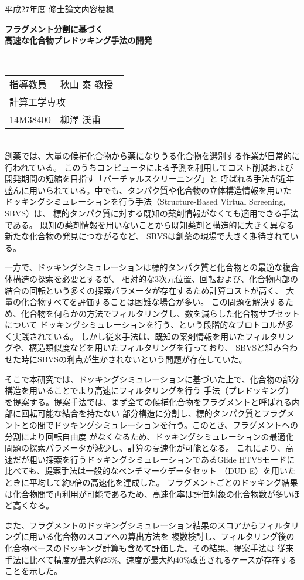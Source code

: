 {
 \thispagestyle{empty}
 \large
 \noindent
 平成27年度 修士論文内容梗概
　\\
 \begin{center}
  \textbf{\LARGE フラグメント分割に基づく\\高速な化合物プレドッキング手法の開発}
 \end{center}
　\\
 \hfill 
 \begin{tabular}{llll}
 指導教員& \multicolumn{3}{l}{秋山 泰 教授} \\
  \multicolumn{4}{l}{計算工学専攻} \\
 14M38400\hspace{.5cm} & {柳澤 渓甫}
 \end{tabular}

\mbox{}\\

創薬では、大量の候補化合物から薬になりうる化合物を選別する作業が日常的に行われている。
このうちコンピュータによる予測を利用してコスト削減および開発期間の短縮を目指す「バーチャルスクリーニング」と
呼ばれる手法が近年盛んに用いられている。中でも、タンパク質や化合物の立体構造情報を用いた
ドッキングシミュレーションを行う手法（Structure-Based Virtual Screening, SBVS）は、
標的タンパク質に対する既知の薬剤情報がなくても適用できる手法である。
既知の薬剤情報を用いないことから既知薬剤と構造的に大きく異なる新たな化合物の発見につながるなど、
SBVSは創薬の現場で大きく期待されている。

一方で、ドッキングシミュレーションは標的タンパク質と化合物との最適な複合体構造の探索を必要とするが、
相対的な3次元位置、回転および、化合物内部の結合の回転という多くの探索パラメータが存在するため計算コストが高く、
大量の化合物すべてを評価することは困難な場合が多い。
この問題を解決するため、化合物を何らかの方法でフィルタリングし、数を減らした化合物サブセットについて
ドッキングシミュレーションを行う、という段階的なプロトコルが多く実践されている。
しかし従来手法は、既知の薬剤情報を用いたフィルタリングや、構造類似度などを用いたフィルタリングを行っており、
SBVSと組み合わせた時にSBVSの利点が生かされないという問題が存在していた。

そこで本研究では、ドッキングシミュレーションに基づいた上で、化合物の部分構造を用いることでより高速にフィルタリングを行う
手法（プレドッキング）を提案する。提案手法では、まず全ての候補化合物をフラグメントと呼ばれる内部に回転可能な結合を持たない
部分構造に分割し、標的タンパク質とフラグメントとの間でドッキングシミュレーションを行う。このとき、フラグメントへの分割により回転自由度
がなくなるため、ドッキングシミュレーションの最適化問題の探索パラメータが減少し、計算の高速化が可能となる。
これにより、高速だが粗い探索を行うドッキングシミュレーションであるGlide HTVSモードに比べても、提案手法は一般的なベンチマークデータセット
（DUD-E）を用いたときに平均して約9倍の高速化を達成した。
フラグメントごとのドッキング結果は化合物間で再利用が可能であるため、高速化率は評価対象の化合物数が多いほど高くなる。

また、フラグメントのドッキングシミュレーション結果のスコアからフィルタリングに用いる化合物のスコアへの算出方法を
複数検討し、フィルタリング後の化合物ベースのドッキング計算も含めて評価した。その結果、提案手法は
従来手法に比べて精度が最大約25\%、速度が最大約40\%改善されるケースが存在することを示した。

\thispagestyle{empty}
\addtocounter{page}{-1}
}
